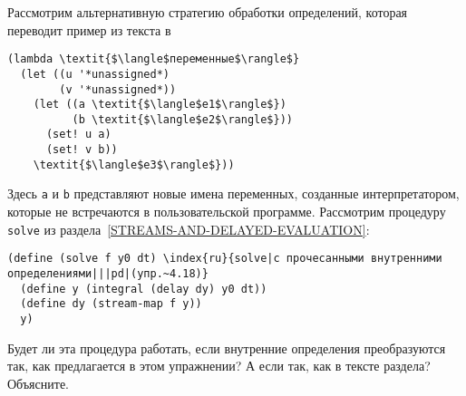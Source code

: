 \begin{exercise}{4.18}%
\label{EX4.18}%
Рассмотрим альтернативную стратегию обработки
определений, которая переводит пример из текста в

\begin{Verbatim}[fontsize=\small]
(lambda \textit{$\langle$переменные$\rangle$}
  (let ((u '*unassigned*)
        (v '*unassigned*))
    (let ((a \textit{$\langle$e1$\rangle$})
          (b \textit{$\langle$e2$\rangle$}))
      (set! u a)
      (set! v b))
    \textit{$\langle$e3$\rangle$}))
\end{Verbatim}
Здесь {\tt a} и {\tt b} представляют новые имена
переменных, созданные интерпретатором, которые не встречаются в
пользовательской программе.  Рассмотрим процедуру {\tt solve}
из раздела~\ref{STREAMS-AND-DELAYED-EVALUATION}:

\begin{Verbatim}[fontsize=\small]
(define (solve f y0 dt) \index{ru}{solve|с прочесанными внутренними определениями|||pd|(упр.~4.18)}
  (define y (integral (delay dy) y0 dt))
  (define dy (stream-map f y))
  y)
\end{Verbatim}
Будет ли эта процедура работать, если внутренние определения
преобразуются так, как предлагается в этом упражнении?  А если так,
как в тексте раздела?  Объясните.
\end{exercise}

